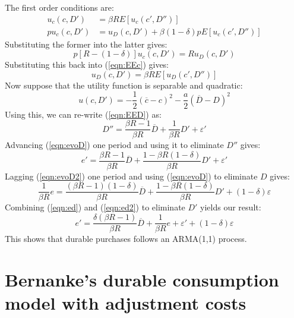 \documentclass[12pt]{article}
\begin{document}
The first order conditions are:
%
\begin{align}
 u_c(c, D') &= \beta R E \left[u_c(c', D'')\right] \label{eqn:EEc} \\
 p u_c(c, D') &= u_D(c, D') + \beta(1 - \delta) p E \left[u_c(c', D'')\right]
\end{align}
%
Substituting the former into the latter gives:
%
\begin{equation}
	p[R - (1 - \delta)] u_c(c, D') = R u_D(c, D')
\end{equation}
%
Substituting this back into (\ref{eqn:EEc}) gives:
%
\begin{equation}
 u_D(c, D') = \beta R E \left[u_D(c', D'')\right] \label{eqn:EED}
\end{equation}
%
Now suppose that the utility function is separable and quadratic:
%
\begin{equation}
 u(c, D') = -\frac{1}{2}(\overline{c} - c)^2 - \frac{a}{2}(\overline{D} - D)^2
\end{equation}
%
Using this, we can re-write (\ref{eqn:EED}) as:
%
\begin{equation}
 D'' = \frac{\beta R - 1}{\beta R} \overline{D} + \frac{1}{\beta R} D' + \varepsilon' \label{eqn:evoD2}
\end{equation}
%
Advancing (\ref{eqn:evoD}) one period and using it to eliminate \(D''\) gives:
%
\begin{equation}
 e' = \frac{\beta R - 1}{\beta R} \overline{D} + \frac{1 - \beta R (1 - \delta)}{\beta R} D' + \varepsilon' \label{eqn:ed}
\end{equation}
%
Lagging (\ref{eqn:evoD2}) one period and using (\ref{eqn:evoD}) to eliminate \(D\) gives:
%
\begin{equation}
 \frac{1}{\beta R} e = \frac{(\beta R - 1)(1 - \delta)}{\beta R} \overline{D} + \frac{1 - \beta R (1 - \delta)}{\beta R} D' + (1 - \delta)\varepsilon \label{eqn:ed2}
\end{equation}
%
Combining (\ref{eqn:ed}) and (\ref{eqn:ed2}) to eliminate \(D'\) yields our result:
%
\begin{equation}
 e' = \frac{\delta(\beta R - 1)}{\beta R} \overline{D} + \frac{1}{\beta R} e + \varepsilon' + (1 - \delta)\varepsilon
\end{equation}
%
This shows that durable purchases follows an ARMA(1,1) process.

\section{Bernanke's durable consumption model with adjustment costs}
\end{document}
